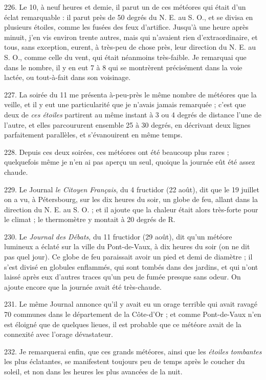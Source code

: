\documentclass[a4paper, 11pt, oneside, polutonikogreek, french]{article}
\begin{document}
226. Le 10, à neuf heures et demie, il parut un de ces météores qui était d'un éclat remarquable : il parut près de 50 degrés du N. E. au S. O., et se divisa en plusieurs étoiles, comme les fusées des feux d'artifice. Jusqu'à une heure après minuit, j'en vis environ trente autres, mais qui n'avaient rien d'extraordinaire, et tous, sans exception, eurent, à très-peu de chose près, leur direction du N. E. au S. O., comme celle du vent, qui était néanmoins très-faible. Je remarquai que dans le nombre, il y en eut 7 à 8 qui se montrèrent précisément dans la voie lactée, ou tout-à-fait dans son voisinage.

227. La soirée du 11 me présenta à-peu-près le même nombre de météores que la veille, et il y eut une particularité que je n'avais jamais remarquée ; c'est que deux de \emph{ces étoiles} partirent au même instant à 3 ou 4 degrés de distance l'une de l'autre, et elles parcoururent ensemble 25 à 30 degrés, en décrivant deux lignes parfaitement parallèles, et s'évanouirent en même temps.

228. Depuis ces deux soirées, ces météores ont été beaucoup plus rares ; quelquefois même je n'en ai pas aperçu un seul, quoique la journée eût été assez chaude.

229. Le Journal \emph{le Citoyen Français}, du 4 fructidor (22 août), dit que le 19 juillet on a vu, à Pétersbourg, sur les dix heures du soir, un globe de feu, allant dans la direction du N. E. au S. O. ; et il ajoute que la chaleur était alors très-forte pour le climat ; le thermomètre y montait à 20 degrés de R.

230. Le \emph{Journal des Débats}, du 11 fructidor (29 août), dit qu'un météore lumineux a éclaté sur la ville du Pont-de-Vaux, à dix heures du soir (on ne dit pas quel jour). Ce globe de feu paraissait avoir un pied et demi de diamètre ; il s'est divisé en globules enflammés, qui sont tombés dans des jardins, et qui n'ont laissé après eux d'autres traces qu'un peu de fumée presque sans odeur. On ajoute encore que la journée avait été très-chaude.

231. Le même Journal annonce qu'il y avait eu un orage terrible qui avait ravagé 70 communes dans le département de la Côte-d'Or ; et comme Pont-de-Vaux n'en est éloigné que de quelques lieues, il est probable que ce météore avait de la connexité avec l'orage dévastateur.

232. Je remarquerai enfin, que ces grands météores, ainsi que les \emph{étoiles tombantes} les plus éclatantes, se manifestent toujours peu de temps après le coucher du soleil, et non dans les heures les plus avancées de la nuit.
\end{document}
